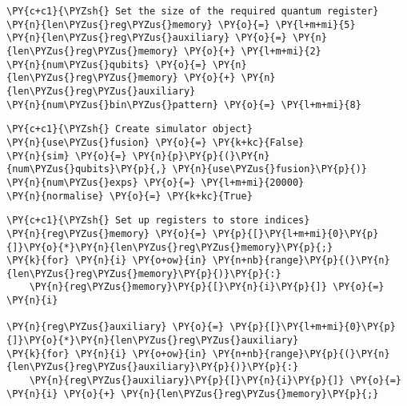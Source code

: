     \begin{tcolorbox}[breakable, size=fbox, boxrule=1pt, pad at break*=1mm,colback=cellbackground, colframe=cellborder]
\begin{Verbatim}[commandchars=\\\{\}]
\PY{c+c1}{\PYZsh{} Set the size of the required quantum register}
\PY{n}{len\PYZus{}reg\PYZus{}memory} \PY{o}{=} \PY{l+m+mi}{5}
\PY{n}{len\PYZus{}reg\PYZus{}auxiliary} \PY{o}{=} \PY{n}{len\PYZus{}reg\PYZus{}memory} \PY{o}{+} \PY{l+m+mi}{2}
\PY{n}{num\PYZus{}qubits} \PY{o}{=} \PY{n}{len\PYZus{}reg\PYZus{}memory} \PY{o}{+} \PY{n}{len\PYZus{}reg\PYZus{}auxiliary}
\PY{n}{num\PYZus{}bin\PYZus{}pattern} \PY{o}{=} \PY{l+m+mi}{8}
\end{Verbatim}
\end{tcolorbox}

    \begin{tcolorbox}[breakable, size=fbox, boxrule=1pt, pad at break*=1mm,colback=cellbackground, colframe=cellborder]
\begin{Verbatim}[commandchars=\\\{\}]
\PY{c+c1}{\PYZsh{} Create simulator object}
\PY{n}{use\PYZus{}fusion} \PY{o}{=} \PY{k+kc}{False}
\PY{n}{sim} \PY{o}{=} \PY{n}{p}\PY{p}{(}\PY{n}{num\PYZus{}qubits}\PY{p}{,} \PY{n}{use\PYZus{}fusion}\PY{p}{)}
\PY{n}{num\PYZus{}exps} \PY{o}{=} \PY{l+m+mi}{20000}
\PY{n}{normalise} \PY{o}{=} \PY{k+kc}{True}
\end{Verbatim}
\end{tcolorbox}

    \begin{tcolorbox}[breakable, size=fbox, boxrule=1pt, pad at break*=1mm,colback=cellbackground, colframe=cellborder]
\begin{Verbatim}[commandchars=\\\{\}]
\PY{c+c1}{\PYZsh{} Set up registers to store indices}
\PY{n}{reg\PYZus{}memory} \PY{o}{=} \PY{p}{[}\PY{l+m+mi}{0}\PY{p}{]}\PY{o}{*}\PY{n}{len\PYZus{}reg\PYZus{}memory}\PY{p}{;}
\PY{k}{for} \PY{n}{i} \PY{o+ow}{in} \PY{n+nb}{range}\PY{p}{(}\PY{n}{len\PYZus{}reg\PYZus{}memory}\PY{p}{)}\PY{p}{:}
    \PY{n}{reg\PYZus{}memory}\PY{p}{[}\PY{n}{i}\PY{p}{]} \PY{o}{=} \PY{n}{i}

\PY{n}{reg\PYZus{}auxiliary} \PY{o}{=} \PY{p}{[}\PY{l+m+mi}{0}\PY{p}{]}\PY{o}{*}\PY{n}{len\PYZus{}reg\PYZus{}auxiliary}
\PY{k}{for} \PY{n}{i} \PY{o+ow}{in} \PY{n+nb}{range}\PY{p}{(}\PY{n}{len\PYZus{}reg\PYZus{}auxiliary}\PY{p}{)}\PY{p}{:}
    \PY{n}{reg\PYZus{}auxiliary}\PY{p}{[}\PY{n}{i}\PY{p}{]} \PY{o}{=} \PY{n}{i} \PY{o}{+} \PY{n}{len\PYZus{}reg\PYZus{}memory}\PY{p}{;}
\end{Verbatim}
\end{tcolorbox}

